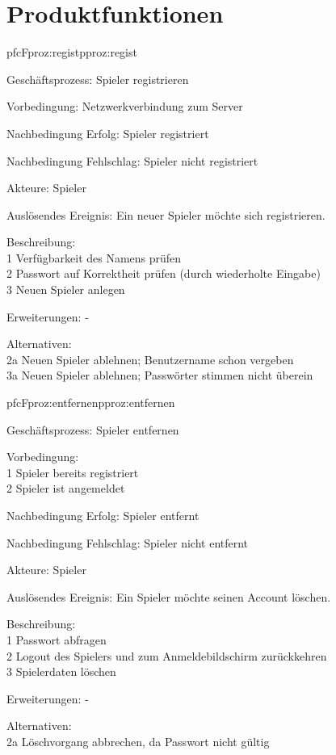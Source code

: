 \chapter{Produktfunktionen}

\setcounter{pfc}{10}

\begin{description}[leftmargin=3em, style=sameline]
	
	\begin{php}{pfc}{F}{proz:regist}{pproz:regist} 
		\item [Geschäftsprozess:] Spieler registrieren
		\item [Vorbedingung:] Netzwerkverbindung zum Server
		\item [Nachbedingung Erfolg:] Spieler registriert
		\item [Nachbedingung Fehlschlag:] Spieler nicht registriert
		\item [Akteure:] Spieler
		\item [Auslösendes Ereignis:] Ein neuer Spieler möchte sich registrieren.
		\item [Beschreibung:]\hfill\\
		1 Verfügbarkeit des Namens prüfen \\
		2 Passwort auf Korrektheit prüfen (durch wiederholte Eingabe) \\
		3 Neuen Spieler anlegen
		\item [Erweiterungen:] -
		\item [Alternativen:]\hfill\\
		2a Neuen Spieler ablehnen; Benutzername schon vergeben \\
		3a Neuen Spieler ablehnen; Passwörter stimmen nicht überein
		
		
	\end{php}
	
	\begin{php}{pfc}{F}{proz:entfernen}{pproz:entfernen}
		\item [Geschäftsprozess:] Spieler entfernen
		\item [Vorbedingung:]\hfill\\
		1 Spieler bereits registriert \\
		2 Spieler ist angemeldet
		\item [Nachbedingung Erfolg:] Spieler entfernt
		\item [Nachbedingung Fehlschlag:] Spieler nicht entfernt
		\item [Akteure:] Spieler
		\item [Auslösendes Ereignis:] Ein Spieler möchte seinen Account löschen.
		\item [Beschreibung:] \hfill\\
		1 Passwort abfragen \\
		2 Logout des Spielers und zum Anmeldebildschirm zurückkehren \\
		3 Spielerdaten löschen
		\item [Erweiterungen:] -
		\item [Alternativen:]\hfill\\
		2a Löschvorgang abbrechen, da Passwort nicht gültig
	\end{php}
	

\end{description}
